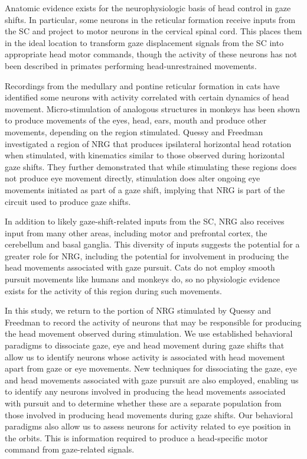 \documentclass[]{article}
\begin{document}
Anatomic evidence exists for the neurophysiologic basis of head control
in gaze shifts. In particular, some neurons in the reticular formation
receive inputs from the SC and project to motor neurons in the cervical
spinal cord. This places them in the ideal location to transform gaze
displacement signals from the SC into appropriate head motor commands,
though the activity of these neurons has not been described in primates
performing head-unrestrained movements.

Recordings from the medullary and pontine reticular formation in cats
have identified some neurons with activity correlated with certain
dynamics of head movement. Micro-stimulation of analogous structures in
monkeys has been shown to produce movements of the eyes, head, ears,
mouth and produce other movements, depending on the region stimulated.
Quessy and Freedman investigated a region of NRG that produces
ipsilateral horizontal head rotation when stimulated, with kinematics
similar to those observed during horizontal gaze shifts. They further
demonstrated that while stimulating these regions does not produce eye
movement directly, stimulation does alter ongoing eye movements
initiated as part of a gaze shift, implying that NRG is part of the
circuit used to produce gaze shifts.

In addition to likely gaze-shift-related inputs from the SC, NRG also
receives input from many other areas, including motor and prefrontal
cortex, the cerebellum and basal ganglia. This diversity of inputs
suggests the potential for a greater role for NRG, including the
potential for involvement in producing the head movements associated
with gaze pursuit. Cats do not employ smooth pursuit movements like
humans and monkeys do, so no physiologic evidence exists for the
activity of this region during such movements.

In this study, we return to the portion of NRG stimulated by Quessy and
Freedman to record the activity of neurons that may be responsible for
producing the head movement observed during stimulation. We use
established behavioral paradigms to dissociate gaze, eye and head
movement during gaze shifts that allow us to identify neurons whose
activity is associated with head movement apart from gaze or eye
movements. New techniques for dissociating the gaze, eye and head
movements associated with gaze pursuit are also employed, enabling us to
identify any neurons involved in producing the head movements associated
with pursuit and to determine whether these are a separate population
from those involved in producing head movements during gaze shifts. Our
behavioral paradigms also allow us to assess neurons for activity
related to eye position in the orbits. This is information required to
produce a head-specific motor command from gaze-related signals.
\end{document}
